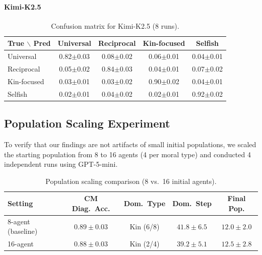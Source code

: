 \paragraph{Kimi-K2.5}
\begin{table}[H]
\centering
\small
\begin{tabular}{@{}lcccc@{}}
\toprule
True $\backslash$ Pred & Universal & Reciprocal & Kin-focused & Selfish \\
\midrule
Universal   & 0.82\scriptsize{$\pm$0.03} & 0.08\scriptsize{$\pm$0.02} & 0.06\scriptsize{$\pm$0.01} & 0.04\scriptsize{$\pm$0.01} \\
Reciprocal  & 0.05\scriptsize{$\pm$0.02} & 0.84\scriptsize{$\pm$0.03} & 0.04\scriptsize{$\pm$0.01} & 0.07\scriptsize{$\pm$0.02} \\
Kin-focused & 0.03\scriptsize{$\pm$0.01} & 0.03\scriptsize{$\pm$0.02} & 0.90\scriptsize{$\pm$0.02} & 0.04\scriptsize{$\pm$0.01} \\
Selfish     & 0.02\scriptsize{$\pm$0.01} & 0.04\scriptsize{$\pm$0.02} & 0.02\scriptsize{$\pm$0.01} & 0.92\scriptsize{$\pm$0.02} \\
\bottomrule
\end{tabular}
\caption{Confusion matrix for Kimi-K2.5 (8 runs).}
\end{table}

\subsection{Population Scaling Experiment}
\label{app:pop_scaling}

To verify that our findings are not artifacts of small initial populations, we scaled the starting population from 8 to 16 agents (4 per moral type) and conducted 4 independent runs using GPT-5-mini.

\begin{table}[H]
\centering
\small
\begin{tabular}{@{}lcccc@{}}
\toprule
\textbf{Setting} & \textbf{CM Diag.\ Acc.} & \textbf{Dom.\ Type} & \textbf{Dom.\ Step} & \textbf{Final Pop.} \\
\midrule
8-agent (baseline) & $0.89 \pm 0.03$ & Kin (6/8) & $41.8 \pm 6.5$ & $12.0 \pm 2.0$ \\
16-agent & $0.88 \pm 0.03$ & Kin (2/4) & $39.2 \pm 5.1$ & $12.5 \pm 2.8$ \\
\bottomrule
\end{tabular}
\caption{Population scaling comparison (8 vs.\ 16 initial agents).}
\end{table}

